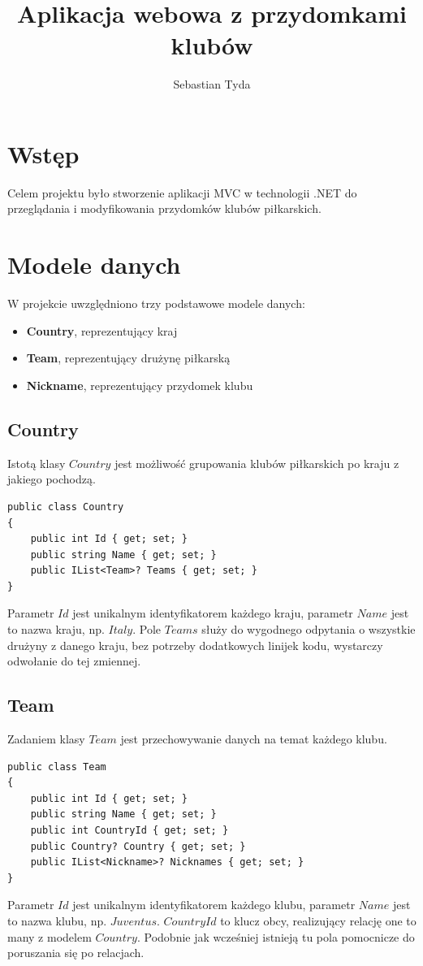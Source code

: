 \documentclass[]{article}
\title{Aplikacja webowa z przydomkami klubów}
\author{Sebastian Tyda}
\begin{document}
\maketitle
\tableofcontents

\newpage
\section*{Wstęp}
Celem projektu było stworzenie aplikacji MVC w technologii .NET do przeglądania i modyfikowania przydomków klubów piłkarskich. 

\section{Modele danych}
W projekcie uwzględniono trzy podstawowe modele danych:
\begin{itemize}
	\item \textbf{Country}, reprezentujący kraj
	\item \textbf{Team}, reprezentujący drużynę piłkarską
	\item \textbf{Nickname}, reprezentujący przydomek klubu
\end{itemize}

\subsection{Country}
Istotą klasy $Country$ jest możliwość grupowania klubów piłkarskich po kraju z jakiego pochodzą.
\begin{lstlisting}
public class Country
{
	public int Id { get; set; }
	public string Name { get; set; }
	public IList<Team>? Teams { get; set; }
}
\end{lstlisting}
Parametr $Id$ jest unikalnym identyfikatorem każdego kraju, parametr $Name$ jest to nazwa kraju, np. $Italy$. Pole $Teams$ służy do wygodnego odpytania o wszystkie drużyny z danego kraju, bez potrzeby dodatkowych linijek kodu, wystarczy odwołanie do tej zmiennej.

\subsection{Team}
Zadaniem klasy $Team$ jest przechowywanie danych na temat każdego klubu.
\begin{lstlisting}
public class Team
{
	public int Id { get; set; }
	public string Name { get; set; }
	public int CountryId { get; set; }
	public Country? Country { get; set; }
	public IList<Nickname>? Nicknames { get; set; }
}
\end{lstlisting}
Parametr $Id$ jest unikalnym identyfikatorem każdego klubu, parametr $Name$ jest to nazwa klubu, np. $Juventus$. $CountryId$ to klucz obcy, realizujący relację one to many z modelem $Country$. Podobnie jak wcześniej istnieją tu pola pomocnicze do poruszania się po relacjach.
\end{document}
